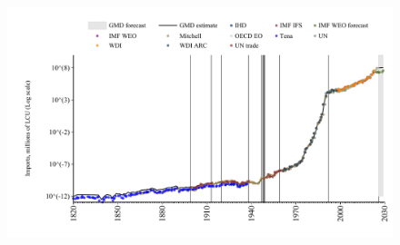 \documentclass[12pt,a4paper,landscape]{article}
\begin{document}
\begin{adjustbox}{max totalsize={\paperwidth}{\paperheight},center}
\begin{minipage}[t][\textheight][t]{\textwidth}
\begin{figure}[H]
\includegraphics[width=\textwidth,height=0.6\textheight,keepaspectratio]{graphs/ARG_imports.pdf}
\end{figure}
\end{minipage}
\end{adjustbox}
\end{document}
